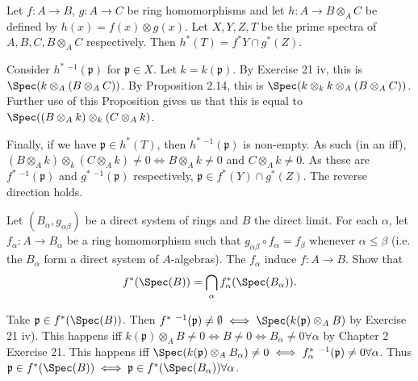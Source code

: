 \documentclass[a4paper]{exam}
\newif\ifhint
\begin{document}
\begin{questions}
\question Let $f:A\to B $, $g:A\to C $ be ring homomorphisms and let $h: A \to B \otimes _A C $ be defined by $h(x) = f(x) \otimes g(x) $. Let $X,Y,Z,T $ be the prime spectra of $A,B,C,B \otimes _A C $ respectively. Then $h^\ast(T) = f^\ast Y \cap g^\ast(Z) $.
\ifhint
	Let $\mathfrak{p} \in X $, and let $k = k(\mathfrak{p}) $ be the residue field at $\mathfrak{p} $.
	By Exercise 21, the fiber $h^\ast\ ^{-1}(\mathfrak{p}) $ is the spectrum of $(B \otimes _A C) \otimes _A k \cong (B \otimes _A k) \otimes _k (C \otimes _A k) $.
	Hence $\mathfrak{p} \in h^\ast(T) \iff (B \otimes _A k) \otimes _k (C \otimes _A k) \ne 0 \iff B \otimes _A k \ne 0 $ and $C \otimes _A k \ne 0 \iff \mathfrak{p}\in f^\ast(Y) \cap g^\ast(Z)$.
\fi
\begin{solution}
	Consider $h^\ast\ ^{-1}(\mathfrak{p}) $ for $\mathfrak{p} \in X $.
	Let $k = k(\mathfrak{p}) $.
	By Exercise 21 iv, this is $\Spec(k \otimes _A (B \otimes _A C))$.
	By Proposition 2.14, this is $\Spec(k \otimes _k k \otimes _A (B \otimes _A C))$.
	Further use of this Proposition gives us that this is equal to $\Spec((B \otimes _A k) \otimes _k (C \otimes _A k)$.

	Finally, if we have $\mathfrak{p}\in h^\ast(T) $, then $h^\ast\ ^{-1}(\mathfrak{p}) $ is non-empty.
	As such (in an iff), $(B \otimes _A k) \otimes _k (C \otimes _A k) \ne 0 \iff B \otimes _A k \ne 0 $ and $C \otimes _A k \ne 0 $.
	As these are $f^\ast\ ^{-1}(\mathfrak{p}) $ and $g^\ast\ ^{-1}(\mathfrak{p})$ respectively, $\mathfrak{p} \in f^\ast(Y) \cap g^\ast(Z) $.
	The reverse direction holds.
\end{solution}

\question Let $(B_{\alpha }, g_{\alpha \beta}) $ be a direct system of rings and $B $ the direct limit. For each $\alpha $, let $f_{\alpha}: A\to B_{\alpha} $ be a ring homomorphism such that $g_{\alpha \beta} \circ f_{\alpha} = f_{\beta}$ whenever $\alpha\le \beta $ (i.e. the $B_{\alpha} $ form a direct system of $A $-algebras). The $f_{\alpha} $ induce $f:A\to B $. Show that
\[
	f^\ast(\Spec(B)) = \bigcap_{\alpha} f^\ast_ \alpha (\Spec(B_ \alpha))
.\] 
\begin{solution}
	Take $\mathfrak{p} \in f^\ast(\Spec(B)) $.
	Then $f^\ast\ ^{-1}(\mathfrak{p}) \ne \emptyset \iff \Spec(k(\mathfrak{p}) \otimes _A B)$ by Exercise 21 iv).
	This happens iff $k(\mathfrak{p}) \otimes _A B \ne 0 \iff B \ne 0 \iff B_ \alpha \ne 0 \forall \alpha$ by Chapter 2 Exercise 21.
	This happens iff $\Spec(k(\mathfrak{p}) \otimes _A B_ \alpha) \ne 0 \iff f_ \alpha^\ast\ ^{-1}(\mathfrak{p}) \ne 0 \forall \alpha $.
	Thus $\mathfrak{p} \in f^\ast(\Spec(B)) \iff \mathfrak{p} \in f^\ast(\Spec(B_ \alpha)) \forall \alpha$.
\end{solution}


\end{questions}
\end{document}
